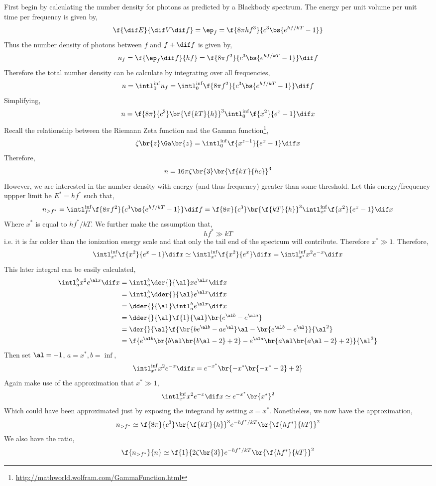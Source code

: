 \documentclass{article}
\begin{document}
First begin by calculating the number density for photons as predicted by a Blackbody spectrum. The energy per unit volume per unit time per frequency is given by,
\[ \f{\dif E}{\dif V \dif f} = \ep_f = \f{8 \pi h f^3}{c^3 \bs{e^{h f/ k T} - 1}}\]
Thus the number density of photons between $f$ and $f + \dif f$ is given by,
\[ n_f = \f{\ep_f \dif f}{h f}  = \f{8 \pi f^2}{c^3 \bs{e^{h f/ k T} - 1}} \dif f\]
Therefore the total number density can be calculate by integrating over all frequencies,
\[ n = \intl_{0}^{\inf} n_f = \intl_{0}^{\inf} \f{8 \pi f^2}{c^3 \bs{e^{h f/ k T} - 1}} \dif f\]
Simplifying,
\[ n = \f{8 \pi}{c^3}\br{\f{kT}{h}}^3 \intl_{0}^{\inf} \f{ x^2}{{e^{x} - 1}} \dif x\]
Recall the relationship between the Riemann Zeta function and the Gamma function\footnote{\url{http://mathworld.wolfram.com/GammaFunction.html}},
\[ \zeta\br{z}\Ga\br{z} = \intl_{0}^{\inf} \f{x^{z-1}}{e^{x} - 1}\dif x \]
Therefore,
\[ n = 16 \pi \zeta\br{3} \br{\f{k T}{hc}}^3 \]
However, we are interested in the number density with energy (and thus frequency) greater than some threshold. Let this energy/frequency uppper limit be $E^* = h f^*$ such that,
\[ n_{> f^*} = \intl_{f^{*}}^{\inf} \f{8 \pi f^2}{c^3 \bs{e^{h f/ k T} - 1}} \dif f = \f{8 \pi}{c^3}\br{\f{kT}{h}}^3 \intl_{x^*}^{\inf} \f{ x^2}{{e^{x} - 1}} \dif x \]
Where $x^*$ is equal to $h f^{*} / k T$. We further make the assumption that,
\[ h f^{*} \gg k T \]
i.e. it is far colder than the ionization energy scale and that only the tail end of the spectrum will contribute. Therefore $x^* \gg 1$. Therefore,
\[ \intl_{x^*}^{\inf} \f{ x^2}{{e^{x} - 1}} \dif x \simeq \intl_{x^*}^{\inf} \f{ x^2}{e^{x}} \dif x = \intl_{x^*}^{\inf} x^2 e^{-x} \dif x \]
This later integral can be easily calculated,
\begin{align*}
\intl_{a}^{b} x^2 e^{\al x} \dif x
&= \intl_{a}^{b} \der{}{\al} x e^{\al x} \dif x \\
&= \intl_{a}^{b} \dder{}{\al}e^{\al x} \dif x \\
&= \dder{}{\al} \intl_{a}^{b} e^{\al x} \dif x \\
&= \dder{}{\al} \f{1}{\al}\br{e^{\al b} - e^{\al a}} \\
&= \der{}{\al} \f{\br{b e^{\al b} - a e^{\al}}\al - \br{e^{\al b} - e^{\al}}}{\al^2} \\
&= \f{e^{\al b} \br{b \al \br{b \al - 2} + 2} - e^{\al a} \br{a \al \br{a \al - 2} + 2}}{\al^3}
\end{align*}
Then set $\al = -1$, $a = x^{*}, b= \inf$,
\[ \intl_{x^*}^{\inf} x^2 e^{-x} \dif x = e^{- x^{*}} \br{-x^{*} \br{- x^{*} - 2} + 2} \]
Again make use of the approximation that $x^{*} \gg 1$,
\[ \intl_{x^*}^{\inf} x^2 e^{-x} \dif x \simeq e^{- x^{*}} \br{x^{*}}^2 \]
Which could have been approximated just by exposing the integrand by setting $x = x^*$. Nonetheless, we now have the approximation,
\[ n_{> f^*} \simeq \f{8 \pi}{c^3}\br{\f{kT}{h}}^3 e^{- h f^{*}/ kT} \br{\f{h f^{*}}{kT}}^2 \]
We also have the ratio,
\[ \f{n_{> f^*}}{n} \simeq \f{1}{2 \zeta\br{3}}e^{- h f^{*}/ kT} \br{\f{h f^{*}}{kT}}^2 \]
\end{document}
